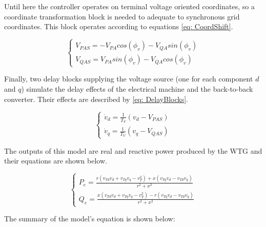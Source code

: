 Until here the controller operates on terminal voltage oriented coordinates, so a coordinate transformation block is needed to adequate to synchronous grid coordinates. This block operates according to equations \eqref{eq: CoordShift}.

\begin{equation}
	\begin{cases}
		V_{PAS} = -V_{PA}cos(\phi_{v}) - V_{QA}sin(\phi_{v}) \\
		V_{QAS} = V_{PA}sin(\phi_{v}) - V_{QA}cos(\phi_{v})
	\end{cases}
	\label{eq: CoordShift}
\end{equation}

Finally, two delay blocks supplying the voltage source (one for each component $d$ and $q$) simulate the delay effects of the electrical machine and the back-to-back converter. Their effects are described by \eqref{eq: DelayBlocks}.

\begin{equation}
	\begin{cases}
		\dot{v}_{d} = \frac{1}{T_{V}}(v_{d} - V_{PAS}) \\
		\dot{v}_{q} = \frac{1}{T_{V}}(v_{q} - V_{QAS})
	\end{cases}
	\label{eq: DelayBlocks}
\end{equation}

The outputs of this model are real and reactive power produced by the WTG and their equations are shown below.

\begin{equation}
	\begin{cases}
		P_{e} = \frac{r(v_{Td}v_{d} + v_{Tq}v_{q} - v_{T}^{2}) + x(v_{Tq}v_{d} - v_{Td}v_{q})}{r^{2} + x^{2}} \\
		Q_{e} = \frac{x(v_{Td}v_{d} + v_{Tq}v_{q} - v_{T}^{2}) - r(v_{Tq}v_{d} - v_{Td}v_{q})}{r^{2} + x^{2}}
	\end{cases}
	\label{eq: Outputs}
\end{equation}

The summary of the model's equation is shown below:

